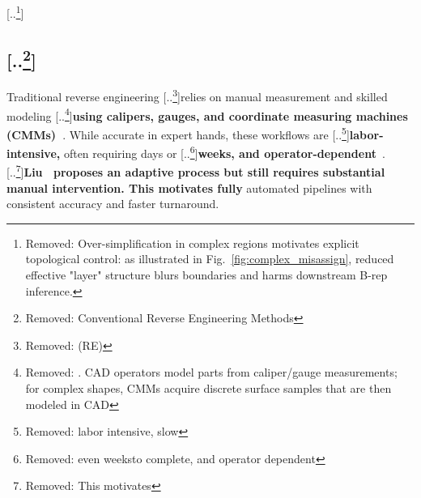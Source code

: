 \documentclass{ieeeaccess}
\providecommand{\DIFaddtex}[1]{{\color{blue}\bfseries #1}} %
\providecommand{\DIFdeltex}[1]{{\color{red}[..\footnote{\color{black}Removed: #1}]}} %
\providecommand{\DIFaddbegin}{} %
\providecommand{\DIFaddend}{} %
\providecommand{\DIFdelbegin}{} %
\providecommand{\DIFdelend}{} %
\providecommand{\DIFadd}[1]{\texorpdfstring{\DIFaddtex{#1}}{#1}} %
\providecommand{\DIFdel}[1]{\texorpdfstring{\DIFdeltex{#1}}{}} %
\begin{document}
\DIFdelbegin %

\DIFdel{Over-simplification in complex regions motivates explicit topological control:
as illustrated in Fig.~\ref{fig:complex_misassign}, reduced effective "layer"
structure blurs boundaries and harms downstream B-rep inference.
}%


\subsection{\DIFdel{Conventional Reverse Engineering Methods}}
\addtocounter{subsection}{-1}%
\DIFdelend Traditional reverse engineering \DIFdelbegin \DIFdel{(RE) }\DIFdelend relies on manual measurement and skilled modeling \DIFdelbegin \DIFdel{. CAD operators model parts from caliper/gauge measurements; for complex shapes, CMMs acquire discrete surface samples that are then modeled in CAD }\DIFdelend \DIFaddbegin \DIFadd{using calipers, gauges, and coordinate measuring machines (CMMs)~}\DIFaddend \cite{b16,b25}. While accurate in expert hands, these workflows are \DIFdelbegin \DIFdel{labor intensive, slow }\DIFdelend \DIFaddbegin \DIFadd{labor-intensive, }\DIFaddend often requiring days or \DIFdelbegin \DIFdel{even weeksto complete, and operator dependent}\DIFdelend \DIFaddbegin \DIFadd{weeks, and operator-dependent}\DIFaddend ~\cite{b16}. \DIFdelbegin \DIFdel{This motivates }\DIFdelend \DIFaddbegin \DIFadd{Liu~\cite{b16} proposes an adaptive process but still requires substantial manual intervention. This motivates fully }\DIFaddend automated pipelines with consistent accuracy and faster turnaround.
\end{document}
